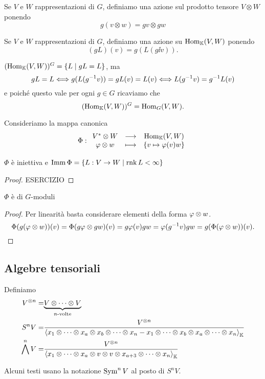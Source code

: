 \begin{definition}
Se $V$ e $W$ rappresentazioni di $G$, definiamo una azione sul prodotto tensore $V\otimes W$ ponendo
\[g(v\otimes w)=gv\otimes gw\]
\end{definition}

\begin{definition}[Omomorfismi]
    Se $V$ e $W$ rappresentazioni di $G$, definiamo una azione su $\operatorname{Hom}_{\mathbb{K}}(V,W)$ ponendo 
    \[(gL)(v)=g(L(g\ii v)).\]
\end{definition}
\begin{remark}
$(\operatorname{Hom}_{\mathbb{K}}(V,W))^G=\left\{{L\mid gL=L}\right\}$, ma
\[gL=L\Longleftrightarrow g(L(g^{-1} v))=gL(v)=L(v)\Longleftrightarrow L(g^{-1} v)=g^{-1} L(v)\]
e poich\'e questo vale per ogni $g\in G$ ricaviamo che
\[(\operatorname{Hom}_{\mathbb{K}}(V,W))^G=\operatorname{Hom}_G(V,W).\]
\end{remark}

Consideriamo la mappa canonica
\[\Phi:\begin{array}{ccc} {V^\ast\otimes W} & \longrightarrow & {\operatorname{Hom}_{\mathbb{K}}(V,W)}\\ {\varphi\otimes w} & \longmapsto & {\left\{{v\mapsto \varphi(v)w}\right\}} \end{array}\]
\begin{remark}
$\Phi$ \`e iniettiva e $\operatorname{Imm} \Phi=\left\{{L:V\to W\mid \operatorname{rnk} L<\infty}\right\}$
\end{remark}
\begin{proof}
ESERCIZIO
\end{proof}

\begin{remark}
$\Phi$ \`e di $G$-moduli
\end{remark}
\begin{proof}
Per linearit\`a basta considerare elementi della forma $\varphi\otimes w$.
\[\Phi(g(\varphi\otimes w))(v)=\Phi(g\varphi\otimes gw)(v)=g\varphi(v)gw=\varphi(g^{-1} v)gw=g(\Phi(\varphi\otimes w))(v).\]
\end{proof}

\subsection{Algebre tensoriali}
\begin{definition}
Definiamo
\begin{align*}
V^{\otimes n}=&\underset{n\text{-volte}}{\underbrace{V\otimes\cdots\otimes V}}\\
S^nV=&\frac{V^{\otimes n}}{\left\langle {x_1\otimes\cdots\otimes x_a\otimes x_b\otimes\cdots\otimes x_n-x_1\otimes\cdots\otimes x_b\otimes x_a\otimes\cdots\otimes x_n}\right\rangle_{\mathbb{K}}}\\
\bigwedge^nV=&\frac{V^{\otimes n}}{\left\langle {x_1\otimes\cdots\otimes x_a\otimes v\otimes v\otimes x_{a+3}\otimes\cdots\otimes x_n}\right\rangle_{\mathbb{K}}}
\end{align*}
\end{definition}
\begin{remark}
Alcuni testi usano la notazione $\operatorname{Sym}^n V$ al posto di $S^nV$.
\end{remark}

